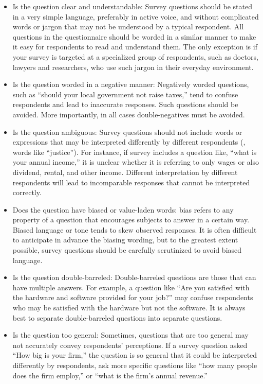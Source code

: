 \begin{itemize}
	\item Is the question clear and understandable: Survey questions should be stated in a very simple language, preferably in active voice, and without complicated words or jargon that may not be understood by a typical respondent. All questions in the questionnaire should be worded in a similar manner to make it easy for respondents to read and understand them. The only exception is if your survey is targeted at a specialized group of respondents, such as doctors, lawyers and researchers, who use such jargon in their everyday environment.

	\item Is the question worded in a negative manner: Negatively worded questions, such as ``should your local government not raise taxes,'' tend to confuse respondents and lead to inaccurate responses. Such questions should be avoided. More importantly, in all cases double-negatives must be avoided.

	\item Is the question ambiguous: Survey questions should not include words or expressions that may be interpreted differently by different respondents (\eg, words like ``justice''). For instance, if survey includes a question like, ``what is your annual income,'' it is unclear whether it is referring to only wages or also dividend, rental, and other income. Different interpretation by different respondents will lead to incomparable responses that cannot be interpreted correctly.

	\item Does the question have biased or value-laden words: \gls{bias} refers to any property of a question that encourages subjects to answer in a certain way. Biased language or tone tends to skew observed responses. It is often difficult to anticipate in advance the biasing wording, but to the greatest extent possible, survey questions should be carefully scrutinized to avoid biased language.

	\item Is the question double-barreled: Double-barreled questions are those that can have multiple answers. For example, a question like ``Are you satisfied with the hardware and software provided for your job?'' may confuse respondents who may be satisfied with the hardware but not the software. It is always best to separate double-barreled questions into separate questions.

	\item Is the question too general: Sometimes, questions that are too general may not accurately convey respondents' perceptions. If a survey question asked ``How big is your firm,'' the question is so general that it could be interpreted differently by respondents, ask more specific questions like ``how many people does the firm employ,'' or ``what is the firm's annual revenue.''


\end{itemize}
